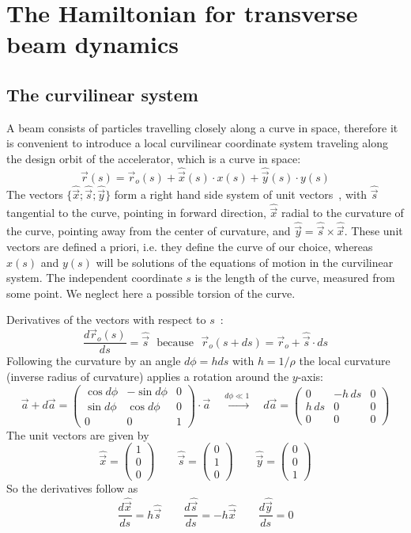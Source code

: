 \documentclass[12pt]{article}
\newcommand\beq{\begin{equation}}
\newcommand\eeq{\end{equation}}
\newcommand{\uvec}[1]{\mbox{$\hat{\vec{#1}}$}}
\begin{document}
\section{\label{secham}The Hamiltonian for transverse beam dynamics}

\subsection{The curvilinear system}
A beam consists of particles travelling closely along a curve in space, therefore
it is convenient to introduce a local curvilinear coordinate system traveling along
the design orbit of the accelerator, which is a curve in space:
\beq\label{rvector}
\vec{r}(s)=\vec{r}_o(s)+\uvec{x}(s)\cdot x(s) + \uvec{y}(s)\cdot y(s)
\eeq
The vectors $\{ \uvec{x};\uvec{s};\uvec{y}\}$ form a right hand side system of unit vectors~\cite{ruth},
with \uvec{s} tangential to the curve, pointing in forward direction, \uvec{x} radial to the curvature of the curve, pointing away from the center of curvature, and $\uvec{y}=\uvec{s}\times\uvec{x}$.
These unit vectors are defined a priori, i.e. they define the curve of our choice, whereas
$x(s)$ and $y(s)$ will be solutions of the equations of motion in the curvilinear system. The independent coordinate $s$ is the length of the curve, measured from some point.
We neglect here a possible torsion of the curve.

Derivatives of the vectors with respect to $s$~\cite{rees,cs}:
\beq\label{dtvecr}
\frac{d\vec{r}_o(s)}{ds}=\uvec{s}\mbox{~~because~~}\vec{r}_o(s+ds)=\vec{r}_o+\uvec{s}\cdot ds
\eeq
Following the curvature by an angle $d\phi=h ds$ with $h=1/\rho$ the local curvature (inverse radius of curvature) applies a rotation around the $y$-axis:
\beq
\vec{a}+d\vec{a} =\left( \begin{array}{ccc}
\cos d\phi & -\sin d\phi & 0 \\ \sin d\phi & \cos d\phi & 0 \\ 0 & 0 & 1
\end{array}\right)\cdot \vec{a} \quad \stackrel{d\phi\ll 1}{\longrightarrow}\quad
d\vec{a} =\left( \begin{array}{ccc}
0 & -h\,ds & 0 \\ h\,ds & 0 & 0 \\ 0 & 0 & 0
\end{array}\right)
\eeq
The unit vectors are given by
\[
\uvec{x}=\left(\begin{array}{c}1 \\ 0 \\ 0 \end{array}\right) \qquad
\uvec{s}=\left(\begin{array}{c}0 \\ 1 \\ 0 \end{array}\right) \qquad
\uvec{y}=\left(\begin{array}{c}0 \\ 0 \\ 1 \end{array}\right)
\]
So the derivatives follow as
\beq\label{duvec}
\frac{d\uvec{x}}{ds}=h\uvec{s}\qquad
\frac{d\uvec{s}}{ds}=-h\uvec{x}\qquad
\frac{d\uvec{y}}{ds}=0
\eeq
\end{document}
